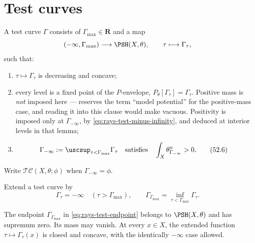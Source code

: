 \section{Test curves}
\label{sec:rays-test-curves}

\begin{definition}
\label{def:rays-test-curve}
A test curve $\Gamma$ consists of
$\Gamma_{\max}\in\mathbf R$ and a map
\[
 (-\infty,\Gamma_{\max})\longrightarrow\PSH(X,\theta),
 \qquad \tau\longmapsto\Gamma_\tau ,
\]
such that:
\begin{enumerate}
\item $\tau\mapsto\Gamma_\tau$ is decreasing and concave;
\item every level is a fixed point of the $P$-envelope,
      $P_\theta[\Gamma_\tau]=\Gamma_\tau$.  Positive mass is \emph{not}
      imposed here ---  reserves the term
      ``model potential'' for the positive-mass case, and reading it into
      this clause would make  vacuous.
      Positivity is imposed only at $\Gamma_{-\infty}$, by
      \eqref{eq:rays-test-minus-infinity}, and deduced at interior levels in
      that lemma;
\item
      \[
      \Gamma_{-\infty}
      :=\uscsup_{\tau<\Gamma_{\max}}\Gamma_\tau
      \quad\text{satisfies}\quad
      \int_X\theta_{\Gamma_{-\infty}}^n>0.
      \tag{52.6}\label{eq:rays-test-minus-infinity}
      \]
\end{enumerate}
Write $\mathcal{TC}(X,\theta;\phi)$ when
$\Gamma_{-\infty}=\phi$.
\end{definition}

Extend a test curve by
\[
 \Gamma_\tau=-\infty\quad(\tau>\Gamma_{\max}),\qquad
 \Gamma_{\Gamma_{\max}}
 =\inf_{\tau<\Gamma_{\max}}\Gamma_\tau .
\tag{52.7}\label{eq:rays-test-endpoint}
\]
\begin{lemma}\label{lem:rays-closed-endpoint}
The endpoint $\Gamma_{\Gamma_{\max}}$ in
\eqref{eq:rays-test-endpoint} belongs to $\PSH(X,\theta)$ and has
supremum zero.  Its mass may vanish.  At every $x\in X$, the
extended function $\tau\mapsto\Gamma_\tau(x)$ is closed and concave,
with the identically $-\infty$ case allowed.
\end{lemma}

